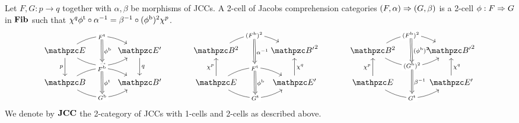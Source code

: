 \documentclass{lmcs} %
\theoremstyle{plain}\newtheorem{satz}[thm]{Satz} %
\begin{document}
Let $F,G:p\to q$ together with $\alpha,\beta$ be morphisms of JCCs. A 2-cell of Jacobs comprehension categories $(F,\alpha)\Rightarrow(G,\beta)$ is a 2-cell $\phi:F\Rightarrow G$ in $\mathbf{Fib}$ such that $\chi^{q}{\phi}^{\mathrm{t}}\circ\alpha^{-1}=\beta^{-1}\circ({\phi}^{\mathrm{b}})^{2}\chi^{p}$.
			\[\begin{tikzcd}[row sep=5ex,column sep=7ex]
				{\ct{E}} & {\ct{E'}} & {\Arr{\ct{B}}} & {\Arr{\ct{B'}}} & {\Arr{\ct{B}}} & {\Arr{\ct{B'}}} \\
				{\ct{B}} & {\ct{B'}} & {\ct{E}} & {\ct{E'}} & {\ct{E}} & {\ct{E'}}
				\arrow[""{name=0, anchor=center, inner sep=0}, "{\ft{G}}"{description}, bend right, from=1-1, to=1-2]
				\arrow[""{name=1, anchor=center, inner sep=0}, "{\ft{F}}"{description}, bend left, from=1-1, to=1-2]
				\arrow["p"', from=1-1, to=2-1]
				\arrow["q", from=1-2, to=2-2]
				\arrow[""{name=2, anchor=center, inner sep=0}, "{\Arr{(\fb{F})}}"{description}, bend left, from=1-3, to=1-4]
				\arrow[""{name=3, anchor=center, inner sep=0}, "{\Arr{(\fb{G})}}"{description}, bend right, from=1-5, to=1-6]
				\arrow[""{name=4, anchor=center, inner sep=0}, "{\Arr{(\fb{F})}}"{description}, bend left, from=1-5, to=1-6]
				\arrow[""{name=5, anchor=center, inner sep=0}, "{\fb{F}}"{description}, bend left, from=2-1, to=2-2]
				\arrow[""{name=6, anchor=center, inner sep=0}, "{\fb{G}}"{description}, bend right, from=2-1, to=2-2]
				\arrow["{\jcomp{p}}", from=2-3, to=1-3]
				\arrow[""{name=7, anchor=center, inner sep=0}, "{\ft{G}}"{description}, bend right, from=2-3, to=2-4]
				\arrow[""{name=8, anchor=center, inner sep=0}, "{\ft{F}}"{description}, bend left, from=2-3, to=2-4]
				\arrow["{\jcomp{q}}"', from=2-4, to=1-4]
				\arrow["{\jcomp{p}}", from=2-5, to=1-5]
				\arrow[""{name=9, anchor=center, inner sep=0}, "{\ft{G}}"{description}, bend right, from=2-5, to=2-6]
				\arrow["{\jcomp{q}}"', from=2-6, to=1-6]
				\arrow["\fb{\phi}", shorten <=3pt, shorten >=3pt, Rightarrow, from=1, to=0]
				\arrow["{\alpha^{-1}}", shorten <=4pt, shorten >=4pt, Rightarrow, from=2, to=8]
				\arrow["{\Arr{(\fb{\phi})}}", shorten <=3pt, shorten >=3pt, Rightarrow, from=4, to=3]
				\arrow["{\beta^{-1}}", shorten <=4pt, shorten >=4pt, Rightarrow, from=3, to=9]
				\arrow["\ft{\phi}", shorten <=3pt, shorten >=3pt, Rightarrow, from=5, to=6]
				\arrow["\fb{\phi}", shorten <=3pt, shorten >=3pt, Rightarrow, from=8, to=7]
			\end{tikzcd}\]	
			We denote by $\mathbf{JCC}$ the 2-category of JCCs with 1-cells and 2-cells as described above. 
			
\end{document}
